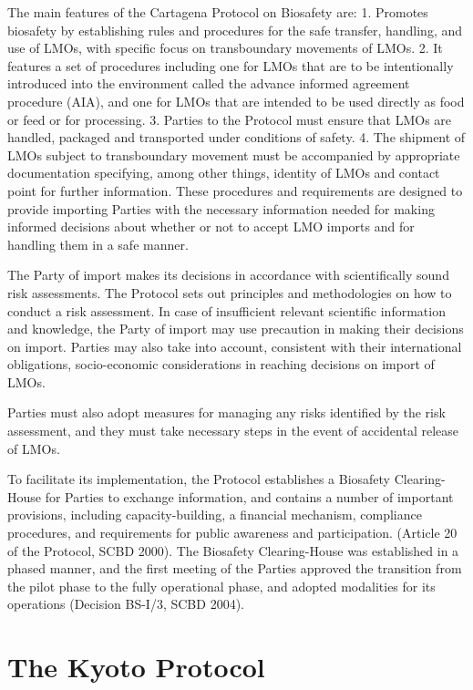\documentclass[
  openany]{book}
\begin{document}
The main features of the Cartagena Protocol on Biosafety are:
1. Promotes biosafety by establishing rules and procedures for the safe transfer, handling, and use of LMOs, with specific focus on transboundary movements of LMOs.
2. It features a set of procedures including one for LMOs that are to be intentionally introduced into the environment called the advance informed agreement procedure (AIA), and one for LMOs that are intended to be used directly as food or feed or for processing.
3. Parties to the Protocol must ensure that LMOs are handled, packaged and transported under conditions of safety.
4. The shipment of LMOs subject to transboundary movement must be accompanied by appropriate documentation specifying, among other things, identity of LMOs and contact point for further information.
These procedures and requirements are designed to provide importing Parties with the necessary information needed for making informed decisions about whether or not to accept LMO imports and for handling them in a safe manner.

The Party of import makes its decisions in accordance with scientifically sound risk assessments. The Protocol sets out principles and methodologies on how to conduct a risk assessment. In case of insufficient relevant scientific information and knowledge, the Party of import may use precaution in making their decisions on import. Parties may also take into account, consistent with their international obligations, socio-economic considerations in reaching decisions on import of LMOs.

Parties must also adopt measures for managing any risks identified by the risk assessment, and they must take necessary steps in the event of accidental release of LMOs.

To facilitate its implementation, the Protocol establishes a Biosafety Clearing-House for Parties to exchange information, and contains a number of important provisions, including capacity-building, a financial mechanism, compliance procedures, and requirements for public awareness and participation. (Article 20 of the Protocol, SCBD 2000). The Biosafety Clearing-House was established in a phased manner, and the first meeting of the Parties approved the transition from the pilot phase to the fully operational phase, and adopted modalities for its operations (Decision BS-I/3, SCBD 2004).

\hypertarget{the-kyoto-protocol}{%
\section{The Kyoto Protocol}\label{the-kyoto-protocol}}
\end{document}
